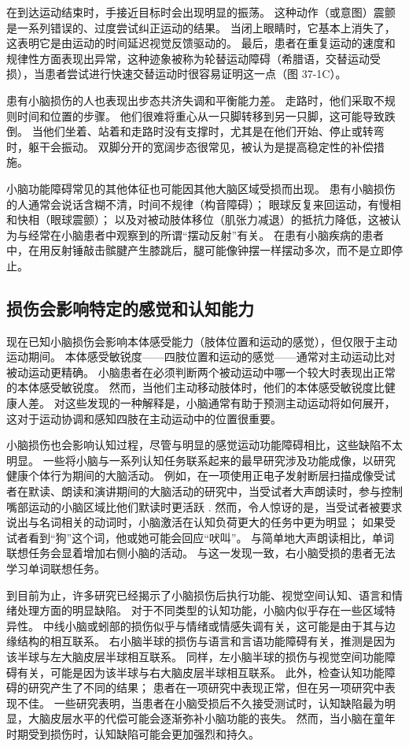 在到达运动结束时，手接近目标时会出现明显的振荡。 这种动作（或意图）震颤是一系列错误的、过度尝试纠正运动的结果。 当闭上眼睛时，它基本上消失了，这表明它是由运动的时间延迟视觉反馈驱动的。 最后，患者在重复运动的速度和规律性方面表现出异常，这种迹象被称为轮替运动障碍（希腊语，交替运动受损），当患者尝试进行快速交替运动时很容易证明这一点（图 37-1C）。

患有小脑损伤的人也表现出步态共济失调和平衡能力差。 走路时，他们采取不规则时间和位置的步骤。 他们很难将重心从一只脚转移到另一只脚，这可能导致跌倒。 当他们坐着、站着和走路时没有支撑时，尤其是在他们开始、停止或转弯时，躯干会振动。 双脚分开的宽阔步态很常见，被认为是提高稳定性的补偿措施。

小脑功能障碍常见的其他体征也可能因其他大脑区域受损而出现。 患有小脑损伤的人通常会说话含糊不清，时间不规律（构音障碍）； 眼球反复来回运动，有慢相和快相（眼球震颤）； 以及对被动肢体移位（肌张力减退）的抵抗力降低，这被认为与经常在小脑患者中观察到的所谓“摆动反射”有关。 在患有小脑疾病的患者中，在用反射锤敲击髌腱产生膝跳后，腿可能像钟摆一样摆动多次，而不是立即停止。

\subsection{损伤会影响特定的感觉和认知能力}
现在已知小脑损伤会影响本体感受能力（肢体位置和运动的感觉），但仅限于主动运动期间。 本体感受敏锐度——四肢位置和运动的感觉——通常对主动运动比对被动运动更精确。 小脑患者在必须判断两个被动运动中哪一个较大时表现出正常的本体感受敏锐度。 然而，当他们主动移动肢体时，他们的本体感受敏锐度比健康人差。 对这些发现的一种解释是，小脑通常有助于预测主动运动将如何展开，这对于运动协调和感知四肢在主动运动中的位置很重要。

小脑损伤也会影响认知过程，尽管与明显的感觉运动功能障碍相比，这些缺陷不太明显。 一些将小脑与一系列认知任务联系起来的最早研究涉及功能成像，以研究健康个体行为期间的大脑活动。 例如，在一项使用正电子发射断层扫描成像受试者在默读、朗读和演讲期间的大脑活动的研究中，当受试者大声朗读时，参与控制嘴部运动的小脑区域比他们默读时更活跃 . 然而，令人惊讶的是，当受试者被要求说出与名词相关的动词时，小脑激活在认知负荷更大的任务中更为明显； 如果受试者看到“狗”这个词，他或她可能会回应“吠叫”。 与简单地大声朗读相比，单词联想任务会显着增加右侧小脑的活动。 与这一发现一致，右小脑受损的患者无法学习单词联想任务。

到目前为止，许多研究已经揭示了小脑损伤后执行功能、视觉空间认知、语言和情绪处理方面的明显缺陷。 对于不同类型的认知功能，小脑内似乎存在一些区域特异性。 中线小脑或蚓部的损伤似乎与情绪或情感失调有关，这可能是由于其与边缘结构的相互联系。 右小脑半球的损伤与语言和言语功能障碍有关，推测是因为该半球与左大脑皮层半球相互联系。 同样，左小脑半球的损伤与视觉空间功能障碍有关，可能是因为该半球与右大脑皮层半球相互联系。 此外，检查认知功能障碍的研究产生了不同的结果； 患者在一项研究中表现正常，但在另一项研究中表现不佳。 一些研究表明，当患者在小脑受损后不久接受测试时，认知缺陷最为明显，大脑皮层水平的代偿可能会逐渐弥补小脑功能的丧失。 然而，当小脑在童年时期受到损伤时，认知缺陷可能会更加强烈和持久。

